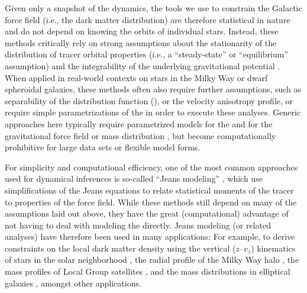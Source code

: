 \documentclass[modern]{aastex63}
\begin{document}
Given only a snapshot of the dynamics, the tools we use to constrain the
Galactic force field (i.e., the dark matter distribution) are therefore
statistical in nature and do not depend on knowing the orbits of individual
stars.
Instead, these methods critically rely on strong assumptions about the
stationarity of the distribution of tracer orbital properties (i.e., a
``steady-state'' or ``equilibrium'' assumption) and the integrability of the
underlying gravitational potential \citep[see, e.g.,][for a review of such
methods as applied to the problem of determining the local dark matter
density]{Read:2014}.
When applied in real-world contexts on stars in the Milky Way or dwarf
spheroidal galaxies, these methods often also require further assumptions, such
as separability of the distribution function (), or the velocity
anisotropy profile, or require simple parametrizations of the  in
order to execute these analyses.
Generic approaches here typically require parametrized models for the
 and for the gravitational force field or mass distribution
\citep[e.g.,][]{McMillan:2013, Magorrian:2014, Binney:2014, Bovy:2016,
Magorrian:2019}, but become computationally prohibitive for large data sets or
flexible model forms.

For simplicity and computational efficiency, one of the most common approaches
used for dynamical inferences is so-called ``Jeans modeling''
\citep{Binney:2008}, which use simplifications of the Jeans equations to relate
statistical moments of the tracer  to properties of the force field.
While these methods still depend on many of the assumptions laid out above, they
have the great (computational) advantage of not having to deal with modeling the
 directly.
Jeans modeling (or related analyses) have therefore been used in many
applications:
For example, to derive constraints on the local dark matter density using the
vertical ($z$--$v_z$) kinematics of stars in the solar neighborhood
\citep[e.g.,][]{Jeans:1922, Oort:1932, Bahcall:1984, Buch:2019}, the radial
profile of the Milky Way halo \citep[e.g.,][]{Watkins:2010, Zhai:2018}, the mass
profiles of Local Group satellites \citep[e.g.,][]{Evans:2009, Walker:2011}, and
the mass distributions in elliptical galaxies \citep[e.g.,][]{Romanowsky:2003,
Mamon:2005, Sonnenfeld:2012}, amongst other applications.
\end{document}
